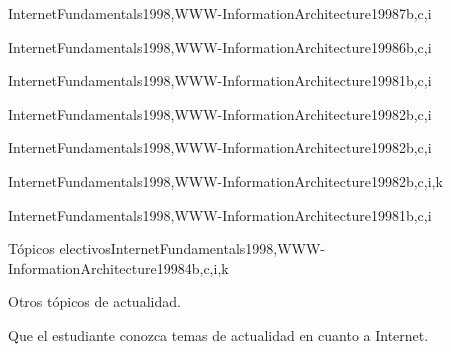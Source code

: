 \begin{syllabus}
\begin{unit}{\NCWebOrganizationDef}{}{InternetFundamentals1998,WWW-InformationArchitecture1998}{7}{b,c,i}
   \NCWebOrganizationAllTopics
   \NCWebOrganizationAllObjectives
\end{unit}

\begin{unit}{\NCNetworkedApplicationsDef}{}{InternetFundamentals1998,WWW-InformationArchitecture1998}{6}{b,c,i}
   \NCNetworkedApplicationsAllTopics
   \NCNetworkedApplicationsAllObjectives
\end{unit}

\begin{unit}{\HCGUIDesignDef}{}{InternetFundamentals1998,WWW-InformationArchitecture1998}{1}{b,c,i}
   \HCGUIDesignAllTopics
   \HCGUIDesignAllObjectives
\end{unit}

\begin{unit}{\NCMultimediaTechnologiesDef}{}{InternetFundamentals1998,WWW-InformationArchitecture1998}{2}{b,c,i}
   \NCMultimediaTechnologiesAllTopics
   \NCMultimediaTechnologiesAllObjectives
\end{unit}

\begin{unit}{\HCMultimediaAndMultimodalSystemsDef}{}{InternetFundamentals1998,WWW-InformationArchitecture1998}{2}{b,c,i}
   \HCMultimediaAndMultimodalSystemsAllTopics
   \HCMultimediaAndMultimodalSystemsAllObjectives
\end{unit}

\begin{unit}{\SESoftwareValidationDef}{}{InternetFundamentals1998,WWW-InformationArchitecture1998}{2}{b,c,i,k}
   \SESoftwareValidationAllTopics
   \SESoftwareValidationAllObjectives
\end{unit}

\begin{unit}{\SPPrivateAndCivilLibertiesDef}{}{InternetFundamentals1998,WWW-InformationArchitecture1998}{1}{b,c,i}
   \SPPrivateAndCivilLibertiesAllTopics
   \SPPrivateAndCivilLibertiesAllObjectives
\end{unit}

\begin{unit}{Tópicos electivos}{}{InternetFundamentals1998,WWW-InformationArchitecture1998}{4}{b,c,i,k}
\begin{topics}
      \item Otros tópicos de actualidad.
   \end{topics}
   \begin{learningoutcomes}
      \item Que el estudiante conozca temas de actualidad en cuanto a Internet.
   \end{learningoutcomes}
\end{unit}

\begin{coursebibliography}
\end{coursebibliography}

\end{syllabus}

%
